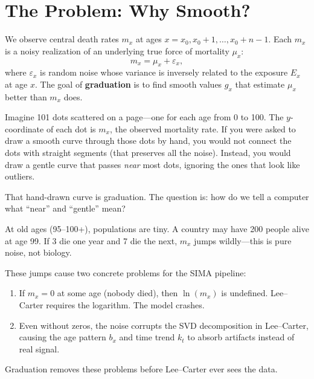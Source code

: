 \documentclass[11pt,a4paper]{article}
\begin{document}
\section{The Problem: Why Smooth?}

\begin{formaldef}
We observe central death rates $m_x$ at ages $x = x_0, x_0+1, \ldots, x_0+n-1$.
Each $m_x$ is a noisy realization of an underlying true force of mortality $\mu_x$:
\[
  m_x = \mu_x + \varepsilon_x,
\]
where $\varepsilon_x$ is random noise whose variance is inversely related to the exposure $E_x$ at age $x$.  The goal of \textbf{graduation} is to find smooth values $g_x$ that estimate $\mu_x$ better than $m_x$ does.
\end{formaldef}

\begin{intuition}
Imagine 101 dots scattered on a page---one for each age from 0 to 100.  The $y$-coordinate of each dot is $m_x$, the observed mortality rate.  If you were asked to draw a smooth curve through those dots by hand, you would not connect the dots with straight segments (that preserves all the noise).  Instead, you would draw a gentle curve that passes \emph{near} most dots, ignoring the ones that look like outliers.

That hand-drawn curve is graduation.  The question is: how do we tell a computer what ``near'' and ``gentle'' mean?
\end{intuition}

\begin{application}
At old ages (95--100+), populations are tiny.  A country may have 200 people alive at age 99.  If 3 die one year and 7 die the next, $m_x$ jumps wildly---this is pure noise, not biology.

These jumps cause two concrete problems for the SIMA pipeline:
\begin{enumerate}[nosep]
  \item If $m_x = 0$ at some age (nobody died), then $\ln(m_x)$ is undefined.  Lee--Carter requires the logarithm. The model crashes.
  \item Even without zeros, the noise corrupts the SVD decomposition in Lee--Carter, causing the age pattern $b_x$ and time trend $k_t$ to absorb artifacts instead of real signal.
\end{enumerate}
Graduation removes these problems before Lee--Carter ever sees the data.
\end{application}
\end{document}
